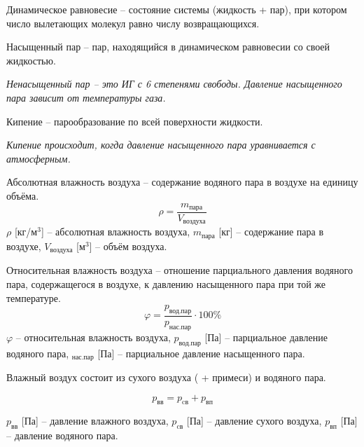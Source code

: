 \documentclass[12pt]{article}
\begin{document}
\begin{definition}
    Динамическое равновесие -- состояние системы (жидкость + пар), при котором число вылетающих молекул равно числу возвращающихся.
\end{definition}
\begin{definition}
    Насыщенный пар -- пар, находящийся в динамическом равновесии со своей жидкостью.\bigskip

    \textit{Ненасыщенный пар -- это ИГ с 6 степенями свободы. Давление насыщенного пара зависит от температуры газа.}
\end{definition}
\begin{definition}
    Кипение -- парообразование по всей поверхности жидкости.\bigskip

    \textit{Кипение происходит, когда давление насыщенного пара уравнивается с атмосферным.}
\end{definition}
\begin{definition}
    Абсолютная влажность воздуха -- содержание водяного пара в воздухе на единицу объёма.
    $$\rho=\frac{m_\text{пара}}{V_\text{воздуха}}$$
    $\rho$ [кг/м$^3$] -- абсолютная влажность воздуха, $m_\text{пара}$ [кг] -- содержание пара в воздухе, $V_\text{воздуха}$ [м$^3$] -- объём воздуха. 
\end{definition}
\begin{definition}
    Относительная влажность воздуха -- отношение парциального давления водяного пара, содержащегося в воздухе, к давлению насыщенного пара при той же температуре.
    $$\varphi=\frac{p_\text{вод.пар}}{p_\text{нас.пар}}\cdot 100\%$$
    $\varphi$ -- относительная влажность воздуха, $p_\text{вод.пар}$ [Па] -- парциальное давление водяного пара, $_\text{нас.пар}$ [Па] -- парциальное давление насыщенного пара.
\end{definition}
\begin{law}
    Влажный воздух состоит из сухого воздуха ( + примеси) и  водяного пара.
\end{law}
\begin{law}[Дальтона]
    $$p_{\text{вв}}=p_{\text{cв}}+p_{\text{вп}}$$
    \begin{center}
        \begin{minipage}{12cm}
            $p_{\text{вв}}$ [Па] – давление влажного воздуха, $p_{\text{cв}}$ [Па] -- давление сухого воздуха, $p_{\text{вп}}$ [Па] – давление водяного пара.
        \end{minipage}
    \end{center}
\end{law}
\end{document}
